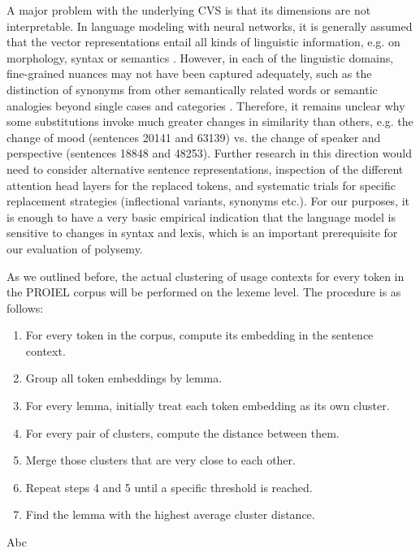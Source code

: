 \documentclass[runningheads]{llncs}
\begin{document}
A major problem with the underlying \gls{CVS} is that its dimensions are not interpretable. In language modeling with neural networks, it is generally assumed that the vector representations entail all kinds of linguistic information, e.g. on morphology, syntax or semantics \parencites[8]{gladkovaAnalogybasedDetectionMorphological2016}[143]{rogersTooManyProblems2017}. However, in each of the linguistic domains, fine-grained nuances may not have been captured adequately, such as the distinction of synonyms from other semantically related words \parencite[115]{karanDistributionalSemanticsApproach2012} or semantic analogies beyond single cases and categories \parencite[142f.]{rogersTooManyProblems2017}. Therefore, it remains unclear why some substitutions invoke much greater changes in similarity than others, e.g. the change of mood (sentences 20141 and 63139) vs. the change of speaker and perspective (sentences 18848 and 48253). Further research in this direction would need to consider alternative sentence representations, inspection of the different attention head layers for the replaced tokens, and systematic trials for specific replacement strategies (inflectional variants, synonyms etc.). For our purposes, it is enough to have a very basic empirical indication that the language model is sensitive to changes in syntax and lexis, which is an important prerequisite for our evaluation of polysemy.

As we outlined before, the actual clustering of usage contexts for every token in the PROIEL corpus will be performed on the lexeme level. The procedure is as follows:
\begin{enumerate}
	\item For every token in the corpus, compute its embedding in the sentence context.
	\item Group all token embeddings by lemma.
	\item For every lemma, initially treat each token embedding as its own cluster.
	\item For every pair of clusters, compute the distance between them.
	\item Merge those clusters that are very close to each other.
	\item Repeat steps 4 and 5 until a specific threshold is reached.
	\item Find the lemma with the highest average cluster distance.
\end{enumerate}
Abc
\end{document}
